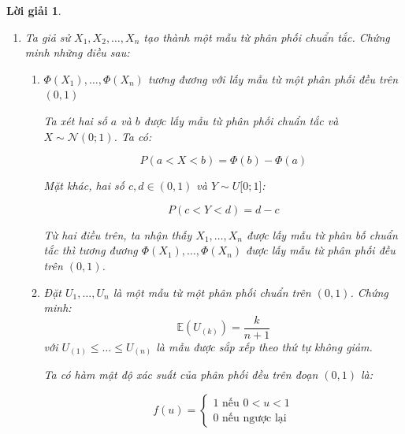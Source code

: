 \documentclass[14pt, a4paper]{article}
\theoremstyle{sltheorem}
\theoremstyle{soltheorem}
\newtheorem*{loigiai}{Lời giải}
\begin{document}
\begin{loigiai}
\begin{enumerate}[wide, labelwidth=!, labelindent=0pt,label=\textbf{\arabic*}.]
        Từ đây ta suy ra $y_q = \mu + \sigma z_q$ hay $y_q$ có thể được biểu diễn từ $z_q$ bằng phương trình đường thẳng với hệ số góc là $\sigma$ và hệ số chặn là $\mu$ (điều phải chứng minh).

        \item Ta giả sử $X_1, X_2, \dots, X_n$ tạo thành một mẫu từ phân phối chuẩn tắc.
        Chứng minh những điều sau:

        \begin{enumerate}
            \item $\Phi(X_1), \dots, \Phi(X_n)$ tương đương với lấy mẫu từ một phân phối đều trên $(0, 1)$
            
            Ta xét hai số $a$ và $b$ được lấy mẫu từ phân phối chuẩn tắc và $X \sim \mathcal{N}(0;1)$.
            Ta có:

            \begin{equation*}
                P(a < X < b) = \Phi(b) - \Phi(a)
            \end{equation*}

            Mặt khác, hai số $c, d \in (0, 1)$ và $Y \sim U \lbrack 0; 1 \rbrack$:

            \begin{equation*}
                P(c < Y < d) = d - c
            \end{equation*}

            Từ hai điều trên, ta nhận thấy $X_1, \dots, X_n$ được lấy mẫu từ phân bố chuẩn tắc thì tương đương $\Phi(X_1), \dots, \Phi(X_n)$ được lấy mẫu từ phân phối đều trên $(0,1)$.

            \item Đặt $U_1, \dots, U_n$ là một mẫu từ một phân phối chuẩn trên $(0, 1)$. Chứng minh:
            \begin{equation*}
                \mathbb{E} (U_{(k)}) = \dfrac{k}{n+1}
            \end{equation*}
            với $U_{(1)} \leq \dots \leq U_{(n)}$ là mẫu được sắp xếp theo thứ tự không giảm.
            
            Ta có hàm mật độ xác suất của phân phối đều trên đoạn $(0, 1)$ là:

            \begin{equation*}
                f(u) = \begin{cases}
                    1 \text{ nếu } 0 < u < 1 \\
                    0 \text{ nếu ngược lại}
                \end{cases}
            \end{equation*}


\end{enumerate}
\end{enumerate}
\end{loigiai}
\end{document}
